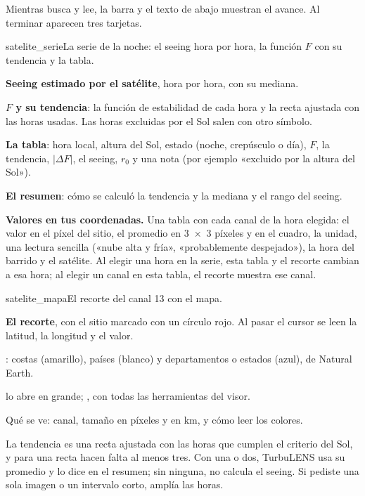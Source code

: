 Mientras busca y lee, la barra y el texto de abajo muestran el avance. Al terminar aparecen tres tarjetas.

\begin{capturam}{satelite_serie}{La serie de la noche: el seeing hora por hora, la función $F$ con su tendencia y la tabla.}
\item \textbf{Seeing estimado por el satélite}, hora por hora, con su mediana.
\item \textbf{$F$ y su tendencia}: la función de estabilidad de cada hora y la recta ajustada con las horas usadas. Las
horas excluidas por el Sol salen con otro símbolo.
\item \textbf{La tabla}: hora local, altura del Sol, estado (noche, crepúsculo o día), $F$, la tendencia, $|\Delta F|$,
el seeing, $r_0$ y una nota (por ejemplo «excluido por la altura del Sol»).
\item \textbf{El resumen}: cómo se calculó la tendencia y la mediana y el rango del seeing.
\end{capturam}

\textbf{Valores en tus coordenadas.} Una tabla con cada canal de la hora elegida: el valor en el píxel del sitio, el
promedio en 3~×~3 píxeles y en el cuadro, la unidad, una lectura sencilla («nube alta y fría», «probablemente
despejado»), la hora del barrido y el satélite. Al elegir una hora en la serie, esta tabla y el recorte cambian a esa hora;
al elegir un canal en esta tabla, el recorte muestra ese canal.

\begin{capturam}[0.9\linewidth]{satelite_mapa}{El recorte del canal 13 con el mapa.}
\item \textbf{El recorte}, con el sitio marcado con un círculo rojo. Al pasar el cursor se leen la latitud, la longitud
y el valor.
\item {}: costas (amarillo), países (blanco) y departamentos o estados (azul), de Natural Earth.
\item {} lo abre en grande; , con todas las herramientas del
visor.
\item Qué se ve: canal, tamaño en píxeles y en km, y cómo leer los colores.
\end{capturam}

\begin{nota}
La tendencia es una recta ajustada con las horas que cumplen el criterio del Sol, y para una recta hacen falta al menos
tres. Con una o dos, TurbuLENS usa su promedio y lo dice en el resumen; sin ninguna, no calcula el seeing. Si pediste una
sola imagen o un intervalo corto, amplía las horas.
\end{nota}

